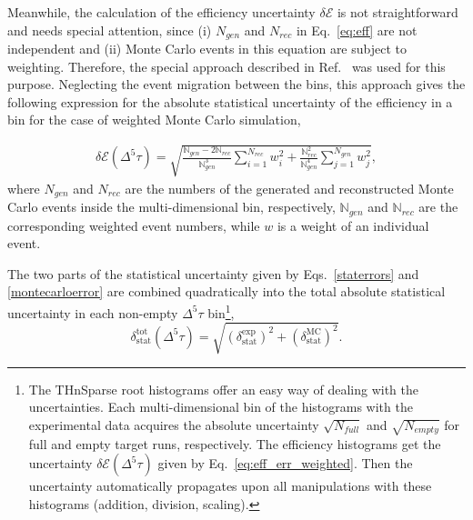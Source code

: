 
Meanwhile, the calculation of the efficiency uncertainty $\delta \mathcal{E}$ is not straightforward and needs special attention, since (i) $N_{gen}$ and $N_{rec}$ in Eq.~\eqref{eq:eff} are not independent and (ii) Monte Carlo events in this equation are subject to weighting. Therefore, the special approach described in Ref.~\cite{Laforge:1996ts} was used for this purpose. Neglecting the event migration between the bins, this approach gives the following expression for the absolute statistical uncertainty of the efficiency in a bin for the case of weighted Monte Carlo simulation,

 


\begin{equation}
\begin{aligned}
\delta \mathcal{E}(\Delta^{5} \tau) = \sqrt{\frac{\mathbb{N}_{gen} - 2\mathbb{N}_{rec}}{\mathbb{N}_{gen}^{3}}\sum\limits_{i=1}^{N_{rec}} w_{i}^{2} + \frac{\mathbb{N}_{rec}^{2}}{\mathbb{N}_{gen}^{4}}\sum\limits_{j=1}^{N_{gen}} w_{j}^{2}},
\end{aligned}
\label{eq:eff_err_weighted}
\end{equation}
where $N_{gen}$ and $N_{rec}$ are the numbers of the generated and reconstructed Monte Carlo events inside the multi-dimensional bin, respectively, $\mathbb{N}_{gen}$ and  $\mathbb{N}_{rec}$ are the corresponding weighted event numbers, while $w$ is a weight of an individual event.


The two parts of the statistical uncertainty given by Eqs.~\eqref{staterrors} and \eqref{montecarloerror} are combined quadratically into the total absolute statistical uncertainty in each non-empty $\Delta^{5} \tau$ bin\footnote[3]{The THnSparse root histograms offer an easy way of dealing with the uncertainties. Each multi-dimensional bin of the histograms with the experimental data acquires the absolute uncertainty $\sqrt{N_{full}}$ and $\sqrt{N_{empty}}$ for full and empty target runs, respectively. The efficiency histograms get the uncertainty $\delta \mathcal{E}(\Delta^{5} \tau)$ given by Eq.~\eqref{eq:eff_err_weighted}. Then the uncertainty automatically propagates upon all manipulations with these histograms (addition, division, scaling).},
\begin{equation}
\delta_{\text{stat}}^{\text{tot}}(\Delta^{5} \tau) =
\sqrt{\left (\delta_{\text{stat}}^{\text{exp}} \right )^{2} + \left (\delta_{\text{stat}}^{\text{MC}}\right )^{2}}.
\label{errortot}
\end{equation}


